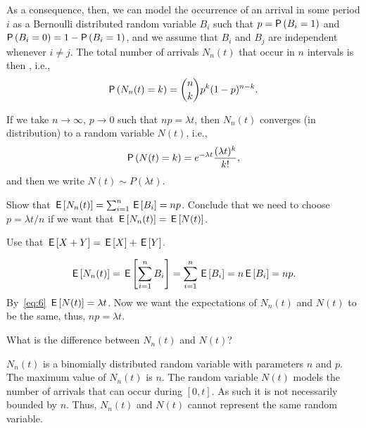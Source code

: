 As a consequence, then, we can model the occurrence of an arrival in some period $i$ as a Bernoulli distributed random variable $B_i$ such that $p=\P{B_i =1}$ and $\P{B_i=0} = 1-\P{B_i = 1}$, and we assume that $B_i$ and $B_j$ are independent whenever $i\neq j$.
The total number of arrivals $N_n(t)$ that occur in $n$ intervals is then , i.e.,
\begin{equation}\label{eq:bin}
  \P{N_n(t) = k} = {n \choose k} p^k (1-p)^{n-k}.
\end{equation}

If we take $n\to\infty$, $p\to0$ such that $n p=\lambda t$, then $N_n(t)$ converges (in distribution) to a  random variable $N(t)$, i.e., 
\begin{equation}\label{eq:pois}
  \P{N(t) = k} = 
e^{-\lambda t} \frac{(\lambda t)^k}{k!}, 
\end{equation}
and then we write $N(t)\sim P(\lambda t)$.


\begin{extra}
Show that $\,\mathsf{E}\left[N_n(t)\right] = \sum_{i=1}^n \,\mathsf{E}\left[B_i\right] = n p$. Conclude that we need to choose $p = \lambda t/n$ if we want that $\,\mathsf{E}\left[N_n(t)\right] = \,\mathsf{E}\left[N(t)\right]$.
\begin{hint}
Use that $\,\mathsf{E}\left[X+Y\right] = \,\mathsf{E}\left[X\right] + \,\mathsf{E}\left[Y\right]$. 
\end{hint}
\begin{solution}
  \begin{equation*}
    \,\mathsf{E}\left[N_n(t)\right] = \,\mathsf{E}\left[\sum_{i=1}^n {B_i}\right] = \sum_{i=1}^n \,\mathsf{E}\left[B_i\right] = n \,\mathsf{E}\left[B_i\right] = n p.
  \end{equation*}
 By~\cref{eq:6} $\,\mathsf{E}\left[N(t)\right] = \lambda t$.  Now we want the expectations of $N_n(t)$ and $N(t)$ to be the same,  thus, $n p = \lambda t$. 
\end{solution}
\end{extra}

\begin{extra}
What is the difference between $N_n(t)$ and $N(t)$?
\begin{solution}
  $N_n(t)$ is a binomially distributed random variable with parameters $n$ and $p$.
  The maximum value of $N_n(t)$ is $n$.
  The random variable $N(t)$ models the number of arrivals that can occur during $[0,t]$.
  As such it is not necessarily bounded by $n$.
  Thus, $N_n(t)$ and $N(t)$ cannot represent the same random variable.
\end{solution}
\end{extra}

